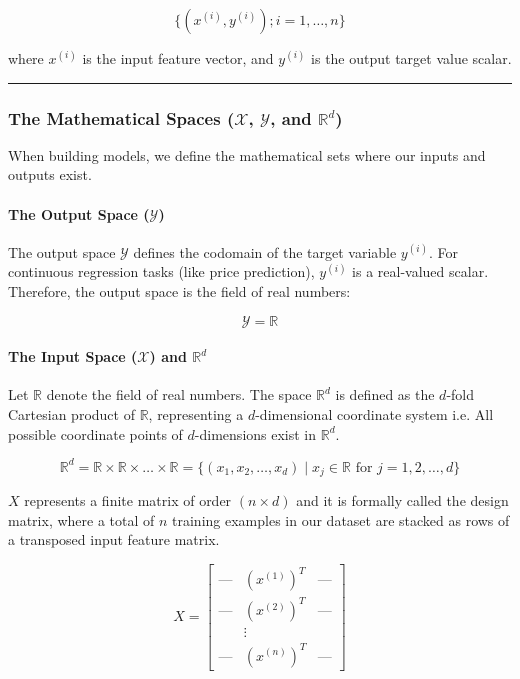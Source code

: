 \documentclass{article}
\begin{document}
\[ \{(x^{(i)}, y^{(i)}); i = 1, \dots, n\} \]

where $x^{(i)}$ is the input feature vector, and $y^{(i)}$ is the output target value scalar.

\vspace{1em}
\noindent\rule{\textwidth}{0.4pt}
\vspace{1em}

\subsubsection*{The Mathematical Spaces ($\mathcal{X}$, $\mathcal{Y}$, and $\mathbb{R}^d$)}

When building models, we define the mathematical sets where our inputs and outputs exist.

\paragraph*{The Output Space ($\mathcal{Y}$)}

The output space $\mathcal{Y}$ defines the codomain of the target variable $y^{(i)}$. For continuous regression tasks (like price prediction), $y^{(i)}$ is a real-valued scalar. Therefore, the output space is the field of real numbers:

\[ \mathcal{Y} = \mathbb{R} \]

\paragraph*{The Input Space ($\mathcal{X}$) and $\mathbb{R}^d$}

Let $\mathbb{R}$ denote the field of real numbers. The space $\mathbb{R}^d$ is defined as the $d$-fold Cartesian product of $\mathbb{R}$, representing a $d$-dimensional coordinate system i.e. All possible coordinate points of $d$-dimensions exist in $\mathbb{R}^d$.

\[ \mathbb{R}^d = \mathbb{R} \times \mathbb{R} \times \dots \times \mathbb{R} = \{(x_1, x_2, \dots, x_d) \mid x_j \in \mathbb{R} \text{ for } j = 1, 2, \dots, d\} \]

$X$ represents a finite matrix of order $(n \times d)$ and it is formally called the design matrix, where a total of $n$ training examples in our dataset are stacked as rows of a transposed input feature matrix. 

\[ X = \begin{bmatrix} \text{---} & (x^{(1)})^T & \text{---} \\ \text{---} & (x^{(2)})^T & \text{---} \\ & \vdots & \\ \text{---} & (x^{(n)})^T & \text{---} \end{bmatrix} \]
\end{document}
